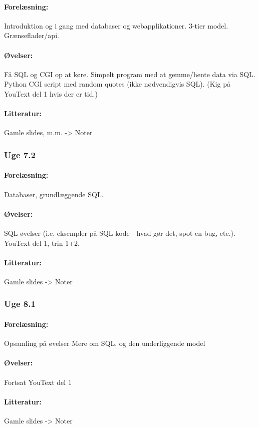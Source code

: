 \documentclass[12pt]{article}
\begin{document}
\paragraph{Forelæsning:} 
Introduktion og i gang med databaser og webapplikationer.
3-tier model. Grænseflader/api.
\paragraph{Øvelser:}
Få SQL og CGI op at køre.
Simpelt program med at gemme/hente data via SQL.
Python CGI script med random quotes (ikke nødvendigvis SQL).
(Kig på YouText del 1 hvis der er tid.)
\paragraph{Litteratur:} Gamle slides, m.m. -> Noter

\subsubsection{Uge 7.2}
\paragraph{Forelæsning:}
Databaser, grundlæggende SQL.
\paragraph{Øvelser:}
SQL øvelser (i.e. eksempler på SQL kode - hvad gør det, spot en bug, etc.).
YouText del 1, trin 1+2.
\paragraph{Litteratur:} Gamle slides -> Noter 

\subsubsection{Uge 8.1}
\paragraph{Forelæsning:} 
Opsamling på øvelser
Mere om SQL, og den underliggende model
\paragraph{Øvelser:}
Fortsat YouText del 1
\paragraph{Litteratur:} Gamle slides -> Noter 
\end{document}

